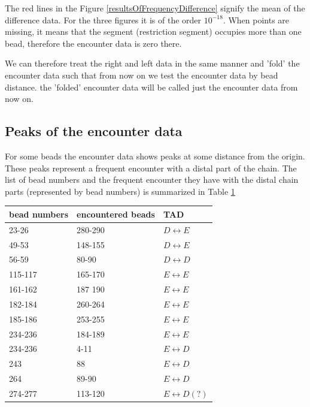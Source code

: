 \documentclass[12pt]{paper}
\begin{document}
The red lines in the Figure \ref{resultsOfFrequencyDifference} signify the mean of the difference data. For the three figures it is of the order $10^{-18}$. When points are missing, it means that the segment (restriction segment) occupies more than one bead, therefore the encounter data is zero there. 

We can therefore treat the right and left data in the same manner and 'fold' the encounter data such that from now on we test the encounter data by bead distance. the 'folded' encounter data will be called just the encounter data from now on. 

\subsection{Peaks of the encounter data}
For some beads the encounter data shows peaks at some distance from the origin. 
These peaks represent a frequent encounter with a distal part of the chain. The list of bead numbers and the frequent encounter they have with the distal chain parts (represented by bead numbers) is summarized in Table \ref{nonNeighborBeadEncounterTable}
\begin{table}[H]\label{nonNeighborBeadEncounterTable}
\begin{tabular}{l l l}
bead numbers & encountered beads & TAD\\
\hline
23-26   & 280-290 & $D\leftrightarrow E$\\
49-53   & 148-155 & $D\leftrightarrow E$\\
56-59   & 80-90   & $D\leftrightarrow D$\\
115-117 & 165-170 & $E\leftrightarrow E$\\
161-162 & 187 190 & $E\leftrightarrow E$\\
182-184 & 260-264 & $E\leftrightarrow E$\\
185-186 & 253-255 & $E\leftrightarrow E$\\
234-236 & 184-189 & $E\leftrightarrow E$\\
234-236 & 4-11    & $E\leftrightarrow D$\\
243     & 88      & $E\leftrightarrow D$\\
264     & 89-90   & $E\leftrightarrow D$\\
274-277 & 113-120 & $E\leftrightarrow D(?)$
\end{tabular}
\end{table}
\end{document}

